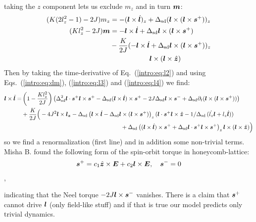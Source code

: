 taking the $z$ component lets us exclude $m_z$ and in turn $\boldsymbol{m}$:
\begin{align}
    (K(2l_z^2-1)-2J)m_z &= -(\boldsymbol{l}\times\dot{\boldsymbol{l}})_z+\Delta_\text{sd} (\boldsymbol{l}\times(\boldsymbol{l}\times\boldsymbol{s}^+))_z\label{intro:eq:l3}\\
    (Kl_z^2-2J)\boldsymbol{m} &= -\boldsymbol{l}\times\dot{\boldsymbol{l}}+\Delta_\text{sd}\boldsymbol{l}\times(\boldsymbol{l}\times\boldsymbol{s}^+)\nonumber\\
    &-\frac{K}{2J} (-\boldsymbol{l}\times\dot{\boldsymbol{l}}+\Delta_\text{sd}\boldsymbol{l}\times(\boldsymbol{l}\times\boldsymbol{s}^+))_z\nonumber\\
    &\hspace{2cm}\boldsymbol{l}\times(\boldsymbol{l}\times\hat{\boldsymbol{z}})\label{intro:eq:l4}
\end{align}
Then by taking the time-derivative of Eq.~(\ref{intro:eq:l2}) and using Eqs.~(\ref{intro:eq:dm}), (\ref{intro:eq:l3}) and (\ref{intro:eq:l4}) we find:
\begin{align}
\bb{l}\times\ddot{\bb{l}} =& \left( 1-\frac{Kl_z^2}{2J} \right) \left(
    \Delta_\text{sd}^2 \bb{l}\cdot\bb{s}^+\bb{l}\times\bb{s}^+-\Delta_\text{sd}(\bb{l}\times\dot{\bb{l}})\times\bb{s}^+-2J\Delta_\text{sd}\bb{l}\times\bb{s}^-
    +\Delta_\text{sd}\partial_t (\bb{l}\times(\bb{l}\times\bb{s}^+))
    \right)\nonumber\\
    &  +\frac{K}{2J}\Big(-4J^2 \bb{l}\times\bb{l_z}-\Delta_{\text{sd}}\left(\bb{l}\times\dot{\bb{l}}-\Delta_\text{sd}\bb{l}\times(\bb{l}\times\bb{s}^+)\right)_z (\bb{l}\cdot\bb{s}^+\bb{l}\times\hat{\bb{z}}-1/\Delta_{\text{sd}}\,(\dot{l_z}\bb{l}+l_z\dot{\bb{l}}))
    \nonumber\\
    & \hspace{6cm}+\Delta_\text{sd}\left((\bb{l}\times\dot{\bb{l}})\times\bb{s}^++\Delta_\text{sd}\bb{l}\cdot\bb{s}^+\bb{l}\times\bb{s}^+\right)_z \bb{l}\times(\bb{l}\times{\hat{\bb{z}}})
    \Big)
\end{align}
so we find a renormalization (first line) and in addition some non-trivial terms. Misha B. found the following form of the spin-orbit torque in honeycomb-lattice: 
\begin{align}
    \boldsymbol{s}^+ = c_1 \hat{\boldsymbol{z}}\times\boldsymbol{E}+c_2 \boldsymbol{l}\times\boldsymbol{E},\quad \boldsymbol{s}^-=0 \end{align},

indicating that the Neel torque $-2J\boldsymbol{l}\times\boldsymbol{s}^-$ vanishes. There is a claim that $\boldsymbol{s}^+$ cannot drive $\boldsymbol{l}$ (only field-like stuff) and if that is true our model predicts only trivial dynamics.
